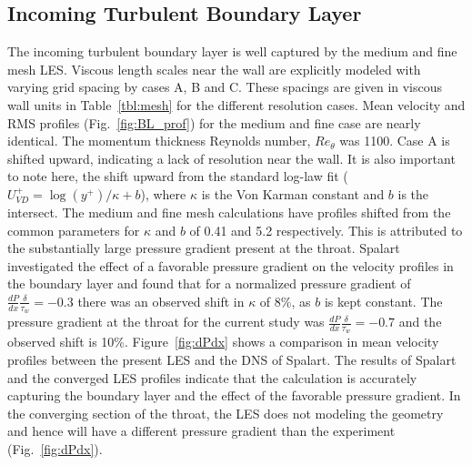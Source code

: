 \documentclass[]{aiaa-tc}%
\begin{document}

\subsection{Incoming Turbulent Boundary Layer}

The incoming turbulent boundary layer is well captured by the medium and fine mesh LES.  Viscous length scales near the wall are explicitly modeled with varying grid spacing by cases A, B and C.  These spacings are given in viscous wall units in Table~\ref{tbl:mesh} for the different resolution cases.  Mean velocity and RMS profiles (Fig.~\ref{fig:BL_prof}) for the medium and fine case are nearly identical.  The momentum thickness Reynolds number, $Re_\theta$ was 1100.  Case A is shifted upward, indicating a lack of resolution near the wall.  It is also important to note here, the shift upward from the standard log-law fit ($U_{VD}^+ = \log(y^+) / \kappa+ b $), where $\kappa$ is the Von Karman constant and $b$ is the intersect.  The medium and fine mesh calculations have profiles shifted from the common parameters for $\kappa$ and $b$ of 0.41 and 5.2 respectively.  This is attributed to the substantially large pressure gradient present at the throat.  Spalart~\cite{Spalart:93} investigated the effect of a favorable pressure gradient on the velocity profiles in the boundary layer and found that for a normalized pressure gradient of $\frac{dP}{dx}\frac{\delta}{\tau_w} = -0.3$ there was an observed shift in $\kappa$ of 8\%, as $b$ is kept constant.  The pressure gradient at the throat for the current study was $\frac{dP}{dx}\frac{\delta}{\tau_w} = -0.7$ and the observed shift is 10\%.  Figure~\ref{fig:dPdx} shows a comparison in mean velocity profiles between the present LES and the DNS of Spalart.  The results of Spalart and the converged LES profiles indicate that the calculation is accurately capturing the boundary layer and the effect of the favorable pressure gradient.  In the converging section of the throat, the LES does not modeling the geometry and hence will have a different pressure gradient than the experiment (Fig.~\ref{fig:dPdx}).
\end{document}
